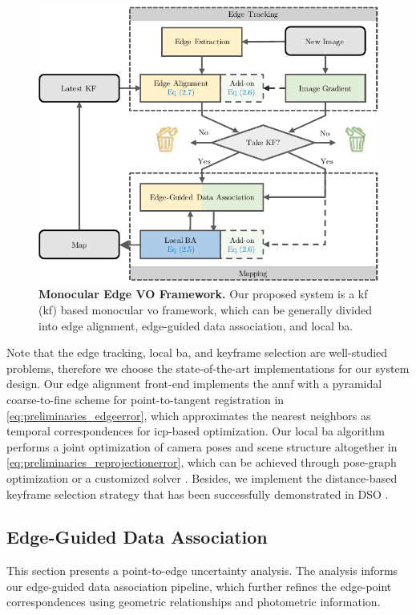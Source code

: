\begin{figure}[t] 
  	\centering
  	\includegraphics[width=0.8\linewidth]{figures/illumination/edge_system.pdf}
    \caption[Monocular Edge VO Framework]{ \textbf{Monocular Edge VO Framework.} Our proposed system is a \acrlong{kf} (\acrshort{kf}) based monocular \acrshort{vo} framework, which can be generally divided into edge alignment, edge-guided data association, and local \acrshort{ba}.
	\label{fig:edge_system}}
\end{figure}

Note that the edge tracking, local \acrshort{ba}, and keyframe selection are well-studied problems, therefore we choose the state-of-the-art implementations for our system design. 
Our edge alignment front-end implements the \acrshort{annf} \cite{zhou2017semi}  \cite{zhou2018canny} with a pyramidal coarse-to-fine scheme for point-to-tangent registration in \ref{eq:preliminaries_edgeerror}, which approximates the nearest neighbors as temporal correspondences for \acrshort{icp}-based optimization. 
Our local \acrshort{ba} algorithm performs a joint optimization of camera poses and scene structure altogether in \ref{eq:preliminaries_reprojectionerror}, which can be achieved through pose-graph optimization \cite{grisetti2011g2o} \cite{dellaert2017gtsam} or a customized solver \cite{engel2017direct}. 
Besides, we implement the distance-based keyframe selection strategy that has been successfully demonstrated in DSO \cite{engel2017direct}.


\subsection{Edge-Guided Data Association}
This section presents a point-to-edge uncertainty analysis. 
The analysis informs our edge-guided data association pipeline, which further refines the edge-point correspondences using geometric relationships and photometric information.


